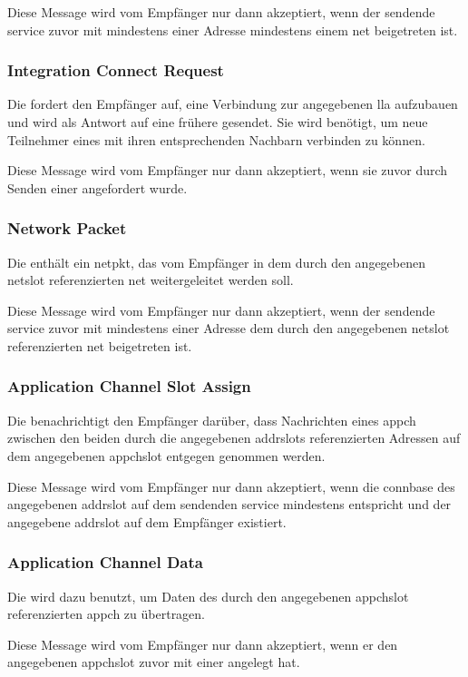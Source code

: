 Diese Message wird vom Empfänger nur dann akzeptiert, wenn der sendende \gls{service} zuvor mit
mindestens einer Adresse mindestens einem \gls{net} beigetreten ist.

\isprotoireqbytefield


\subsubsection{Integration Connect Request}
\label{dcl-isproto-icreq}
Die \msg{\isprotoicreq} fordert den Empfänger auf, eine Verbindung zur angegebenen \gls{lla}
aufzubauen und wird als Antwort auf eine frühere \msg{\isprotoireq} gesendet. Sie wird benötigt,
um neue Teilnehmer eines  mit ihren entsprechenden Nachbarn verbinden zu
können.

Diese Message wird vom Empfänger nur dann akzeptiert, wenn sie zuvor durch Senden einer
\msg{\isprotoireq} angefordert wurde.

\isprotoicreqbytefield


\subsubsection{Network Packet}
\label{dcl-isproto-np}
Die \msg{\isprotonp} enthält ein \gls{netpkt}, das vom Empfänger in dem durch den angegebenen
\gls{netslot} referenzierten \gls{net} weitergeleitet werden soll.

Diese Message wird vom Empfänger nur dann akzeptiert, wenn der sendende \gls{service} zuvor mit
mindestens einer Adresse dem durch den angegebenen \gls{netslot} referenzierten \gls{net}
beigetreten ist.

\isprotonpbytefield


\subsubsection{Application Channel Slot Assign}
\label{dcl-isproto-acsa}
Die \msg{\isprotoacsa} benachrichtigt den Empfänger darüber, dass Nachrichten eines \gls{appch} %
zwischen den beiden durch die angegebenen \glspl{addrslot} referenzierten Adressen auf dem
angegebenen \gls{appchslot} entgegen genommen werden.

Diese Message wird vom Empfänger nur dann akzeptiert, wenn die \gls{connbase} des angegebenen
\gls{addrslot} auf dem sendenden \gls{service} mindestens  entspricht und der
angegebene \gls{addrslot} auf dem Empfänger existiert.

\isprotoacsabytefield


\subsubsection{Application Channel Data}
\label{dcl-isproto-acd}
Die \msg{\isprotoacd} wird dazu benutzt, um Daten des durch den angegebenen \gls{appchslot} %
referenzierten \gls{appch} zu übertragen.

Diese Message wird vom Empfänger nur dann akzeptiert, wenn er den angegebenen \gls{appchslot}
zuvor mit einer \msg{\isprotoacsa} angelegt hat.

\isprotoacdbytefield
